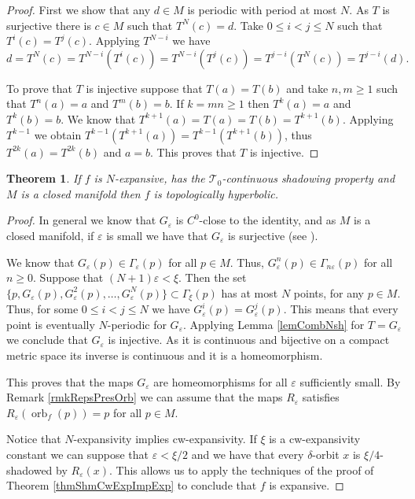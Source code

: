 \documentclass[12pt]{amsart}
\theoremstyle{plain}
\newtheorem{thm}{Theorem}[section]
\theoremstyle{definition}
\theoremstyle{remark}
\DeclareMathOperator{\orb}{orb}
\renewcommand{\epsilon}{\varepsilon}
\newcommand{\expc}{\xi}
\begin{document}
\begin{proof}
First we show that any $d\in M$ is periodic with period at most $N$. As $T$ is surjective there is $c\in M$ such that $T^N(c)=d$.
Take $0\leq i<j\leq N$ such that $T^i(c)=T^j(c)$.
Applying $T^{N-i}$ we have
\[
d=T^N(c)=T^{N-i}(T^i(c))=T^{N-i}(T^j(c))=T^{j-i}(T^N(c))=
T^{j-i}(d).
\]

 To prove that $T$ is injective suppose that $T(a)=T(b)$ and take $n,m\geq 1$ such that $T^n(a)=a$ and $T^m(b)=b$.
 If $k=mn\geq 1$ then $T^k(a)=a$ and $T^k(b)=b$.
 We know that $T^{k+1}(a)=T(a)=T(b)=T^{k+1}(b)$.
 Applying $T^{k-1}$ we obtain
 $T^{k-1}(T^{k+1}(a))=T^{k-1}(T^{k+1}(b))$, thus
 $T^{2k}(a)=T^{2k}(b)$ and $a=b$. This proves that $T$ is injective.
\end{proof}

\begin{thm}
	\label{thmLeeshmN-exp}
If $f$ is $N$-expansive, has the $\mathcal{T}_0$-continuous shadowing property and $M$ is a closed manifold then
$f$ is topologically hyperbolic.
\end{thm}

\begin{proof}
 In general we know that $G_\epsilon$ is $C^0$-close to the identity, and as $M$ is a closed manifold, if $\epsilon$ is small we have that $G_\epsilon$ is surjective (see \cite{Walters1978}).

 We know that $G_\epsilon(p)\in \Gamma_\epsilon(p)$ for all $p\in M$.
 Thus, $G_\epsilon^n(p)\in \Gamma_{n\epsilon}(p)$ for all $n\geq 0$.
Suppose that $(N+1)\epsilon<\expc$.
Then the set $\{p,G_\epsilon(p),G^2_\epsilon(p),\dots,
G_\epsilon^{N}(p)\}\subset\Gamma_{\expc}(p)$ has at most $N$ points, for any $p\in M$.
Thus, for some $0\leq i<j\leq N$ we have $G_\epsilon^i(p)=
G_\epsilon^j(p)$.
This means that every point is eventually $N$-periodic for $G_\epsilon$. Applying Lemma \ref{lemCombNsh} for $T=G_\epsilon$ we conclude that $G_\epsilon$ is injective.
As it is continuous and bijective on a compact metric space its inverse is continuous and it is a homeomorphism.

This proves that the maps $G_\epsilon$ are homeomorphisms for all $\epsilon$ sufficiently small. By Remark \ref{rmkRepsPresOrb}
we can assume that the maps $R_\epsilon$ satisfies
$R_\epsilon(\orb_f(p))=p$ for all $p\in M$.

Notice that $N$-expansivity implies cw-expansivity.
If $\expc$ is a cw-expansivity constant we can suppose that $\epsilon<\expc/2$ and we have that every $\delta$-orbit $x$ is $\expc/4$-shadowed by
$R_\epsilon(x)$. This allows us to apply the techniques of the proof of Theorem \ref{thmShmCwExpImpExp} to conclude that $f$ is expansive.
\end{proof}
\end{document}
